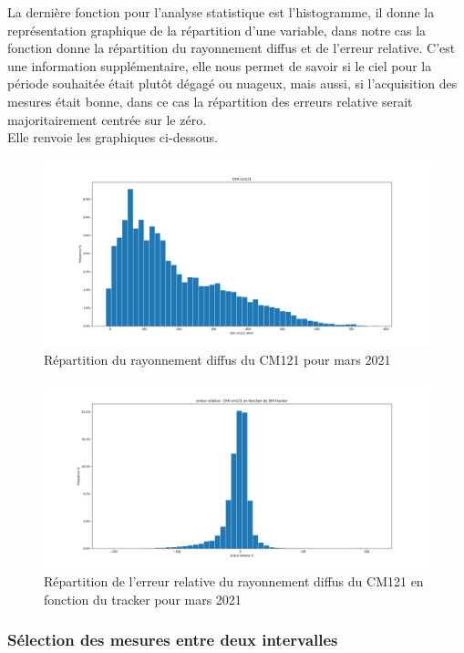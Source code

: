 \documentclass[12pt,a4paper]{article}
\begin{document}
\begin{flushleft}
La dernière fonction pour l'analyse statistique est l'histogramme, il donne la représentation graphique de la répartition d'une variable, dans notre cas la fonction donne la répartition du rayonnement diffus et de l'erreur relative. C'est une information supplémentaire, elle nous permet de savoir si le ciel pour la période souhaitée était plutôt dégagé ou nuageux, mais aussi, si l'acquisition des mesures était bonne, dans ce cas la répartition des erreurs relative serait majoritairement centrée sur le zéro.\\
Elle renvoie les graphiques ci-dessous.
\begin{figure}[H]
\centering
\includegraphics[width=15cm]{image/histogramme/1.png} 
\caption{Répartition du rayonnement diffus du CM121 pour mars 2021}  
\end{figure}

\begin{figure}[H]
\centering
\includegraphics[width=15cm]{image/histogramme/2.png}  
\caption{Répartition de l'erreur relative du rayonnement diffus du CM121 en fonction du tracker pour mars 2021}  
\end{figure}


\subsubsection{Sélection des mesures entre deux intervalles}


\end{flushleft}
\end{document}
